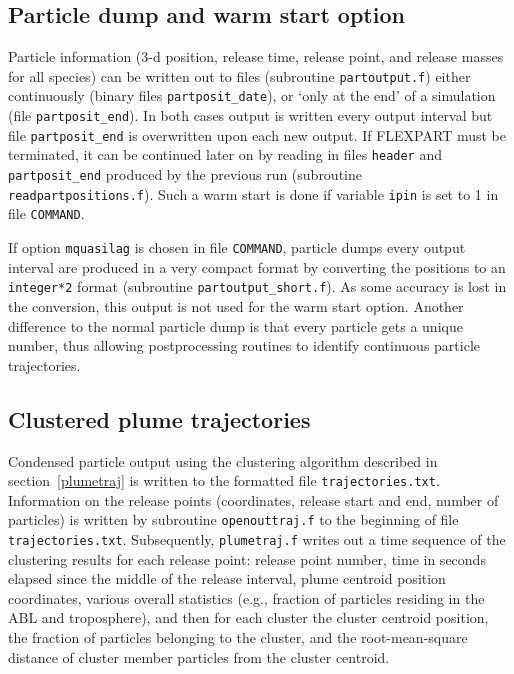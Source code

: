 \documentclass{egu}            %
\begin{document}
\subsection{Particle dump and warm start option}

Particle information (3-d position, release time, release point, and release
masses for all species) can be written out to files (subroutine
\verb|partoutput.f|) either continuously (binary files \verb|partposit_date|),
or `only at the end' of a simulation (file \verb|partposit_end|).  In both
cases output is written every output interval but file \verb|partposit_end| is
overwritten upon each new output.  If FLEXPART must be terminated, it can be
continued later on by reading in files \verb|header| and \verb|partposit_end|
produced by the previous run (subroutine \verb|readpartpositions.f|).  Such a
warm start is done if variable \verb|ipin| is set to 1 in file \verb|COMMAND|.

If option \verb|mquasilag| is chosen in file \verb|COMMAND|, particle dumps
every output interval are produced in a very compact format by converting the
positions to an \verb|integer*2| format (subroutine \verb|partoutput_short.f|).
As some accuracy is lost in the conversion, this output is not used for the
warm start option.  Another difference to the normal particle dump is that
every particle gets a unique number, thus allowing postprocessing routines to
identify continuous particle trajectories.

\subsection{Clustered plume trajectories}

Condensed particle output using the clustering algorithm described in
section~\ref{plumetraj} is written to the formatted file
\verb|trajectories.txt|.  Information on the release points (coordinates,
release start and end, number of particles) is written by subroutine
\verb|openouttraj.f| to the beginning of file \verb|trajectories.txt|.
Subsequently, \verb|plumetraj.f| writes out a time sequence of the clustering
results for each release point: release point number, time in seconds elapsed
since the middle of the release interval, plume centroid position coordinates,
various overall statistics (e.g., fraction of particles residing in the ABL and
troposphere), and then for each cluster the cluster centroid position, the
fraction of particles belonging to the cluster, and the root-mean-square
distance of cluster member particles from the cluster centroid.
\end{document}

